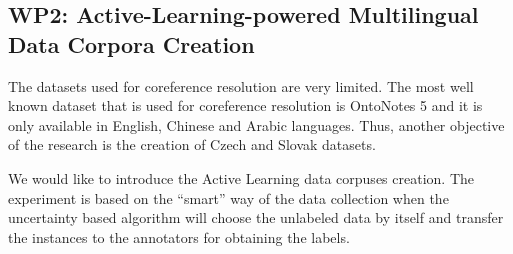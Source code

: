 \subsection*{WP2: Active-Learning-powered Multilingual Data Corpora Creation}

 The datasets used for coreference resolution are very limited. The most well known dataset that is used for coreference resolution is OntoNotes 5 \cite{ontonotes5-Weischedel2013} and it is only available in English, Chinese and Arabic languages. Thus, another objective of the research is the creation of Czech and Slovak datasets.

We would like to introduce the Active Learning data corpuses creation. The experiment is based on the “smart” way of the data collection when the uncertainty based algorithm will choose the unlabeled data by itself and transfer the instances to the annotators for obtaining the labels. 

